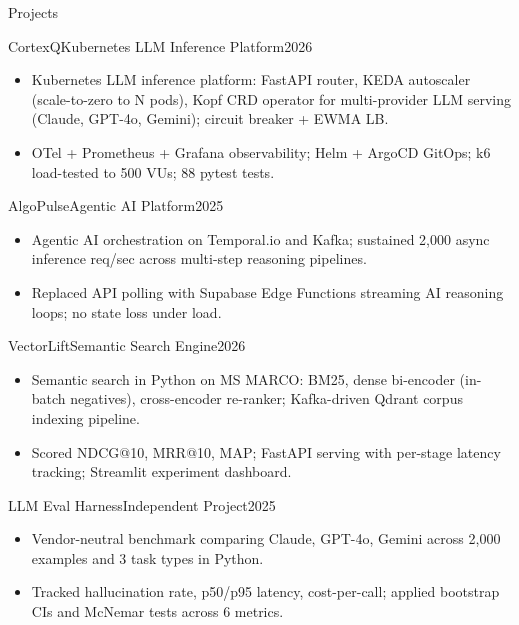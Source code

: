 \documentclass[]{mcdowellcv}
\begin{document}
\begin{cvsection}{Projects}
  \begin{cvsubsection}{CortexQ}{Kubernetes LLM Inference Platform}{2026}
    \begin{itemize}
      \item Kubernetes LLM inference platform: FastAPI router, KEDA autoscaler (scale-to-zero to N pods), Kopf CRD operator for multi-provider LLM serving (Claude, GPT-4o, Gemini); circuit breaker + EWMA LB.
      \item OTel + Prometheus + Grafana observability; Helm + ArgoCD GitOps; k6 load-tested to 500 VUs; 88 pytest tests.
    \end{itemize}
    \vspace{-1.5pt}
  \end{cvsubsection}

  \begin{cvsubsection}{AlgoPulse}{Agentic AI Platform}{2025}
    \begin{itemize}
      \item Agentic AI orchestration on Temporal.io and Kafka; sustained 2,000 async inference req/sec across multi-step reasoning pipelines.
      \item Replaced API polling with Supabase Edge Functions streaming AI reasoning loops; no state loss under load.
    \end{itemize}
    \vspace{-1.5pt}
  \end{cvsubsection}

  \begin{cvsubsection}{VectorLift}{Semantic Search Engine}{2026}
    \begin{itemize}
      \item Semantic search in Python on MS MARCO: BM25, dense bi-encoder (in-batch negatives), cross-encoder re-ranker; Kafka-driven Qdrant corpus indexing pipeline.
      \item Scored NDCG@10, MRR@10, MAP; FastAPI serving with per-stage latency tracking; Streamlit experiment dashboard.
    \end{itemize}
    \vspace{-1.5pt}
  \end{cvsubsection}

  \begin{cvsubsection}{LLM Eval Harness}{Independent Project}{2025}
    \begin{itemize}
      \item Vendor-neutral benchmark comparing Claude, GPT-4o, Gemini across 2,000 examples and 3 task types in Python.
      \item Tracked hallucination rate, p50/p95 latency, cost-per-call; applied bootstrap CIs and McNemar tests across 6 metrics.
    \end{itemize}
  \end{cvsubsection}
\end{cvsection}
\end{document}
